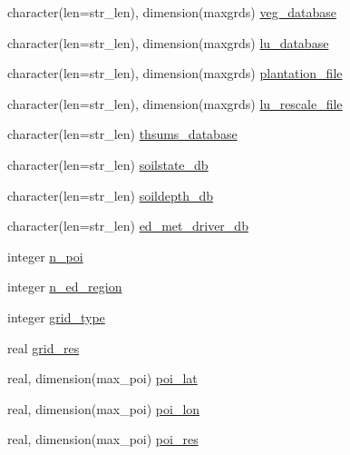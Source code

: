 \begin{DoxyCompactItemize}
\item 
character(len=str\+\_\+len), dimension(maxgrds) \hyperlink{structename__coms_1_1ename__vars_afe4637288a5043b6e185316403d77761}{veg\+\_\+database}
\item 
character(len=str\+\_\+len), dimension(maxgrds) \hyperlink{structename__coms_1_1ename__vars_a2d45fb3e93fbff0afa00f89b817ee9ca}{lu\+\_\+database}
\item 
character(len=str\+\_\+len), dimension(maxgrds) \hyperlink{structename__coms_1_1ename__vars_a466aacc58395db708dab81248d637b31}{plantation\+\_\+file}
\item 
character(len=str\+\_\+len), dimension(maxgrds) \hyperlink{structename__coms_1_1ename__vars_ad489f07618c9860a5d5d1c8d9ceb4ac3}{lu\+\_\+rescale\+\_\+file}
\item 
character(len=str\+\_\+len) \hyperlink{structename__coms_1_1ename__vars_a8a629b50c4a3d00b1eb1deea3b239a6d}{thsums\+\_\+database}
\item 
character(len=str\+\_\+len) \hyperlink{structename__coms_1_1ename__vars_ab3b1aab371445e20968cec38fb70740b}{soilstate\+\_\+db}
\item 
character(len=str\+\_\+len) \hyperlink{structename__coms_1_1ename__vars_a7f495f9cd365ad7e341ee2bb4174715f}{soildepth\+\_\+db}
\item 
character(len=str\+\_\+len) \hyperlink{structename__coms_1_1ename__vars_ab8a19cfd0805eb6cc59b1e4e9eda03f8}{ed\+\_\+met\+\_\+driver\+\_\+db}
\item 
integer \hyperlink{structename__coms_1_1ename__vars_afa96104dce8e3f44f3d792ff6ea5aa5d}{n\+\_\+poi}
\item 
integer \hyperlink{structename__coms_1_1ename__vars_a0da37279c338a3a9c74a700f56ae9557}{n\+\_\+ed\+\_\+region}
\item 
integer \hyperlink{structename__coms_1_1ename__vars_aaae042470167d9e8c1e6a8685bb3193d}{grid\+\_\+type}
\item 
real \hyperlink{structename__coms_1_1ename__vars_a3844568a87246202c0f3195a036dd962}{grid\+\_\+res}
\item 
real, dimension(max\+\_\+poi) \hyperlink{structename__coms_1_1ename__vars_a1a12085b47e9531b651a936ffbb812a2}{poi\+\_\+lat}
\item 
real, dimension(max\+\_\+poi) \hyperlink{structename__coms_1_1ename__vars_af1d56859951803c6fd88df0afc330b3b}{poi\+\_\+lon}
\item 
real, dimension(max\+\_\+poi) \hyperlink{structename__coms_1_1ename__vars_afc6c9bd25439db1dc68ac52ef510c2c6}{poi\+\_\+res}

\end{DoxyCompactItemize}
